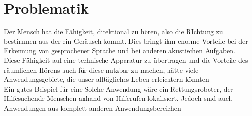 \section{Problematik}
    Der Mensch hat die Fähigkeit, direktional zu hören, also die RIchtung zu bestimmen aus der ein Geräusch kommt. Dies bringt ihm enorme Vorteile bei der Erkennung von gesprochener Sprache und bei anderen akustischen Aufgaben. Diese Fähigkeit auf eine technische Apparatur zu übertragen und die Vorteile des räumlichen Hörens auch für diese nutzbar zu machen, hätte viele Anwendungsgebiete, die unser alltägliches Leben erleichtern könnten.\\
  Ein gutes Beispiel für eine Solche Anwendung wäre ein Rettungsroboter, der Hilfesuchende Menschen anhand von Hilferufen lokalisiert.
  Jedoch sind auch Anwendungen aus komplett anderen Anwendungsbereichen

